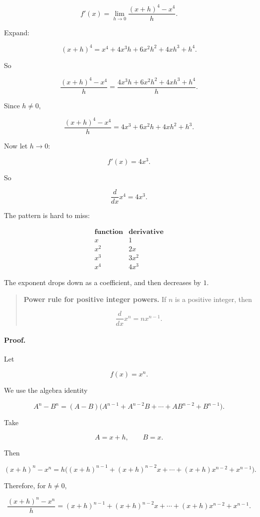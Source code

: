 \[
f'(x)
=
\lim_{h\to0}\frac{(x+h)^4-x^4}{h}.
\]

Expand:

\[
(x+h)^4
=
x^4+4x^3h+6x^2h^2+4xh^3+h^4.
\]

So

\[
\frac{(x+h)^4-x^4}{h}
=
\frac{4x^3h+6x^2h^2+4xh^3+h^4}{h}.
\]

Since \(h\neq0\),

\[
\frac{(x+h)^4-x^4}{h}
=
4x^3+6x^2h+4xh^2+h^3.
\]

Now let \(h\to0\):

\[
f'(x)=4x^3.
\]

So

\[
\frac{d}{dx}x^4=4x^3.
\]

The pattern is hard to miss:

\[
\begin{array}{c|c}
\textbf{function} & \textbf{derivative} \\ \hline
x & 1 \\[2pt]
x^2 & 2x \\[2pt]
x^3 & 3x^2 \\[2pt]
x^4 & 4x^3
\end{array}
\]

The exponent drops down as a coefficient, and then decreases by \(1\).

\begin{quote}
\textbf{Power rule for positive integer powers.}
If \(n\) is a positive integer, then

\[
\boxed{
\frac{d}{dx}x^n=nx^{n-1}.
}
\]
\end{quote}

\paragraph{Proof.}
Let

\[
f(x)=x^n.
\]

We use the algebra identity

\[
A^n-B^n=(A-B)\bigl(A^{n-1}+A^{n-2}B+\cdots+AB^{n-2}+B^{n-1}\bigr).
\]

Take

\[
A=x+h,
\qquad
B=x.
\]

Then

\[
(x+h)^n-x^n
=
h\bigl((x+h)^{n-1}+(x+h)^{n-2}x+\cdots+(x+h)x^{n-2}+x^{n-1}\bigr).
\]

Therefore, for \(h\neq0\),

\[
\frac{(x+h)^n-x^n}{h}
=
(x+h)^{n-1}+(x+h)^{n-2}x+\cdots+(x+h)x^{n-2}+x^{n-1}.
\]

